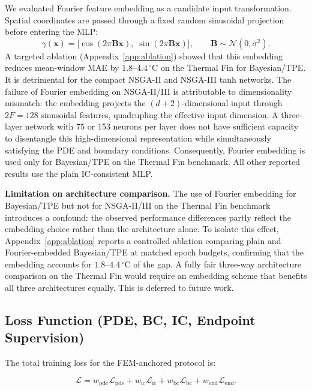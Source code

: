 We evaluated Fourier feature embedding as a candidate input transformation.
Spatial coordinates are passed through a fixed random sinusoidal projection
before entering the MLP:
\begin{equation}
\gamma(\mathbf{x}) = \bigl[\cos(2\pi \mathbf{B}\mathbf{x}),\;
                           \sin(2\pi \mathbf{B}\mathbf{x})\bigr],
\qquad \mathbf{B} \sim \mathcal{N}(0,\sigma^2).
\label{eq:fourier_embed}
\end{equation}
A targeted ablation (Appendix~\ref{app:ablation}) showed that this embedding
reduces mean-window MAE by $1.8$--$4.4\,^\circ\mathrm{C}$ on the Thermal
Fin for Bayesian/TPE.
It is detrimental for the compact NSGA-II and NSGA-III tanh networks.
The failure of Fourier embedding on NSGA-II/III is attributable to
dimensionality mismatch: the embedding projects the $(d+2)$-dimensional input
through $2F=128$ sinusoidal features, quadrupling the effective input
dimension.
A three-layer network with 75 or 153 neurons per layer does not have
sufficient capacity to disentangle this high-dimensional representation while
simultaneously satisfying the PDE and boundary conditions.
Consequently, Fourier embedding is used only for Bayesian/TPE on the Thermal
Fin benchmark.
All other reported results use the plain IC-consistent MLP.

\textbf{Limitation on architecture comparison.}
The use of Fourier embedding for Bayesian/TPE but not for NSGA-II/III on the
Thermal Fin benchmark introduces a confound: the observed performance
differences partly reflect the embedding choice rather than the architecture
alone.
To isolate this effect, Appendix~\ref{app:ablation} reports a controlled
ablation comparing plain and Fourier-embedded Bayesian/TPE at matched epoch
budgets, confirming that the embedding accounts for $1.8$--$4.4\,^\circ\mathrm{C}$
of the gap.
A fully fair three-way architecture comparison on the Thermal Fin would require
an embedding scheme that benefits all three architectures equally.
This is deferred to future work.

\subsection{Loss Function (PDE, BC, IC, Endpoint Supervision)}

The total training loss for the FEM-anchored protocol is:

\begin{equation}
\mathcal{L}
= w_\mathrm{pde}\mathcal{L}_\mathrm{pde}
+ w_\mathrm{ic}\mathcal{L}_\mathrm{ic}
+ w_\mathrm{bc}\mathcal{L}_\mathrm{bc}
+ w_\mathrm{end}\mathcal{L}_\mathrm{end}.
\label{eq:loss_full}
\end{equation}

